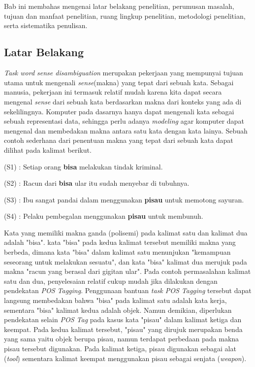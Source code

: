 \chapter{\babSatu}
Bab ini membahas mengenai latar belakang penelitian, perumusan masalah, tujuan dan manfaat penelitian, ruang lingkup penelitian, metodologi penelitian, serta sistematika penulisan.

\section{Latar Belakang}

\textit{Task word sense disambiguation} merupakan pekerjaan yang mempunyai tujuan utama untuk mengenali \textit{sense}(makna) yang tepat dari sebuah kata. Sebagai manusia, pekerjaan ini termasuk relatif mudah karena kita dapat secara mengenal \textit{sense} dari sebuah kata berdasarkan makna dari konteks yang ada di sekelilingnya. Komputer pada dasarnya hanya dapat mengenali kata sebagai sebuah representasi data, sehingga perlu adanya \textit{modeling} agar komputer dapat mengenal dan membedakan makna antara satu kata dengan kata lainya. Sebuah contoh sederhana dari penentuan makna yang tepat dari sebuah kata dapat dilihat pada kalimat berikut.

(S1) : Setiap orang \textbf{bisa} melakukan tindak kriminal.

(S2) : Racun dari \textbf{bisa} ular itu sudah menyebar di tubuhnya.

(S3) : Ibu sangat pandai dalam menggunakan \textbf{pisau} untuk memotong sayuran.

(S4) : Pelaku pembegalan menggunakan \textbf{pisau} untuk membunuh.

Kata yang memiliki makna ganda (polisemi) pada kalimat satu dan kalimat dua adalah "bisa". kata "bisa" pada kedua kalimat tersebut memiliki makna yang berbeda, dimana kata "bisa" dalam kalimat satu menunjukan "kemampuan seseorang untuk melakukan sesuatu", dan kata "bisa" kalimat dua merujuk pada makna "racun yang berasal dari gigitan ular". Pada contoh permasalahan kalimat satu dan dua, penyelesaian relatif cukup mudah jika dilakukan dengan pendekatan \textit{POS Tagging}. Penggunaan bantuan \textit{task POS Tagging} tersebut dapat langsung membedakan bahwa "bisa" pada kalimat satu adalah kata kerja, sementara "bisa" kalimat kedua adalah objek. Namun demikian, diperlukan pendekatan selain \textit{POS Tag} pada kasus kata "pisau" dalam kalimat ketiga dan keempat. Pada kedua kalimat tersebut, "pisau" yang dirujuk merupakan benda yang sama yaitu objek berupa pisau, namun terdapat perbedaan pada makna pisau tersebut digunakan. Pada kalimat ketiga, pisau digunakan sebagai alat (\textit{tool}) sementara kalimat keempat menggunakan pisau sebagai senjata (\textit{weapon}).

